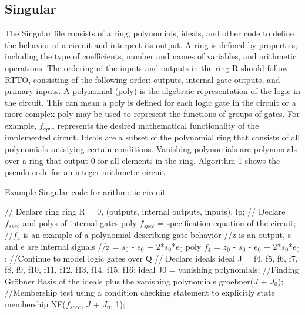 \documentclass[conference]{IEEEtran}
\begin{document}
\subsection{Singular}
The Singular file consists of a ring, polynomials, ideals, and other code to define the behavior of a circuit and interpret its output. A ring is defined by properties, 
including the type of coefficients, number and names of variables, and arithmetic operations. The ordering of the inputs and outputs in 
the ring R should follow RTTO, consisting of the following order: outputs, internal gate outputs, and primary inputs. A polynomial (poly) is the algebraic representation of the logic in the circuit.
This can mean a poly is defined for each logic gate in the circuit or a more complex poly may be used to represent the functions of groups of gates. 
For example, $f_{spec}$ represents the desired mathematical functionality of the implemented circuit. Ideals are a subset of the polynomial ring 
that consists of all polynomials satisfying certain conditions. Vanishing polynomials are polynomials over a ring that output 0 for all elements in the ring.
Algorithm 1 shows the pseudo-code for an integer arithmetic circuit.
\begin{algorithm}
    \caption{Example Singular code for arithmetic circuit}
    \begin{algorithmic}
        \STATE // Declare ring
        \STATE ring R = 0, (outputs, internal outputs, inputs), lp;
        \STATE
        \STATE // Declare $f_{spec}$ and polys of internal gates
        \STATE poly $f_{spec}$ = specification equation of the circuit;
        \STATE //$f_{4}$ is an example of a polynomial describing gate behavior
        \STATE //z is an output, s and e are internal signals
        \STATE //z = $s_{0}$ - $e_{0}$ + 2*$s_{0}$*$e_{0}$
        \STATE poly $f_{4}$ = $z_{0}$ - $s_{0}$ - $e_{0}$ + 2*$s_{0}$*$e_{0}$; 
        \STATE //Continue to model logic gates over Q
        \STATE
        \STATE // Declare ideals
        \STATE ideal J = f4, f5,  f6, f7, f8, f9, f10, f11, f12, f13, f14, f15, f16;
        \STATE ideal J0 = vanishing polynomials;
        \STATE
        \STATE //Finding Gröbner Basis of the ideals plus the vanishing polynomials
        \STATE groebner($J$ + $J_{0}$);
        \STATE
        \STATE //Membership test using a condition checking statement to explicitly state membership
        \STATE NF($f_{spec}$, $J$ + $J_{0}$, 1);
    \end{algorithmic}
\end{algorithm}
\end{document}
